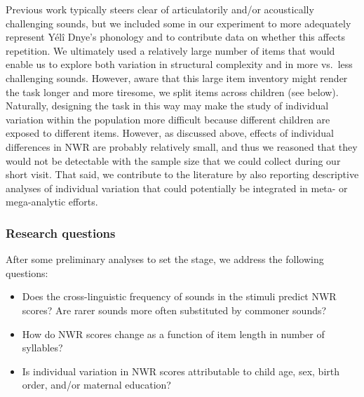 \documentclass[english,,man,floatsintext]{apa6}
\providecommand{\tightlist}{%
  \setlength{\itemsep}{0pt}\setlength{\parskip}{0pt}}
\begin{document}
Previous work typically steers clear of articulatorily and/or acoustically challenging sounds, but we included some in our experiment to more adequately represent Yélî Dnye's phonology and to contribute data on whether this affects repetition. We ultimately used a relatively large number of items that would enable us to explore both variation in structural complexity and in more vs.~less challenging sounds. However, aware that this large item inventory might render the task longer and more tiresome, we split items across children (see below). Naturally, designing the task in this way may make the study of individual variation within the population more difficult because different children are exposed to different items. However, as discussed above, effects of individual differences in NWR are probably relatively small, and thus we reasoned that they would not be detectable with the sample size that we could collect during our short visit. That said, we contribute to the literature by also reporting descriptive analyses of individual variation that could potentially be integrated in meta- or mega-analytic efforts.

\hypertarget{research-questions}{%
\subsubsection{Research questions}\label{research-questions}}

After some preliminary analyses to set the stage, we address the following questions:

\begin{itemize}
\tightlist
\item
  Does the cross-linguistic frequency of sounds in the stimuli predict NWR scores? Are rarer sounds more often substituted by commoner sounds?
\item
  How do NWR scores change as a function of item length in number of syllables?
\item
  Is individual variation in NWR scores attributable to child age, sex, birth order, and/or maternal education?
\end{itemize}
\end{document}
